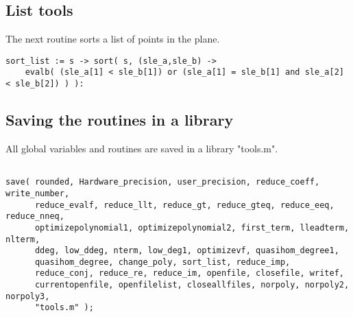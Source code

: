 \documentclass[a4paper,10pt]{article}
\begin{document}
\subsection{List tools}

The next routine sorts a list of points in the plane.

\begin{lstlisting}[name=tools]
sort_list := s -> sort( s, (sle_a,sle_b) ->
    evalb( (sle_a[1] < sle_b[1]) or (sle_a[1] = sle_b[1] and sle_a[2] < sle_b[2]) ) ):
\end{lstlisting}

\subsection{Saving the routines in a library}

All global variables and routines are saved in a library "tools.m".

\begin{lstlisting}[name=tools]

save( rounded, Hardware_precision, user_precision, reduce_coeff, write_number,
      reduce_evalf, reduce_llt, reduce_gt, reduce_gteq, reduce_eeq, reduce_nneq,
      optimizepolynomial1, optimizepolynomial2, first_term, lleadterm, nlterm,
      ddeg, low_ddeg, nterm, low_deg1, optimizevf, quasihom_degree1,
      quasihom_degree, change_poly, sort_list, reduce_imp,
      reduce_conj, reduce_re, reduce_im, openfile, closefile, writef,
      currentopenfile, openfilelist, closeallfiles, norpoly, norpoly2, norpoly3,
      "tools.m" );
\end{lstlisting}
\end{document}
